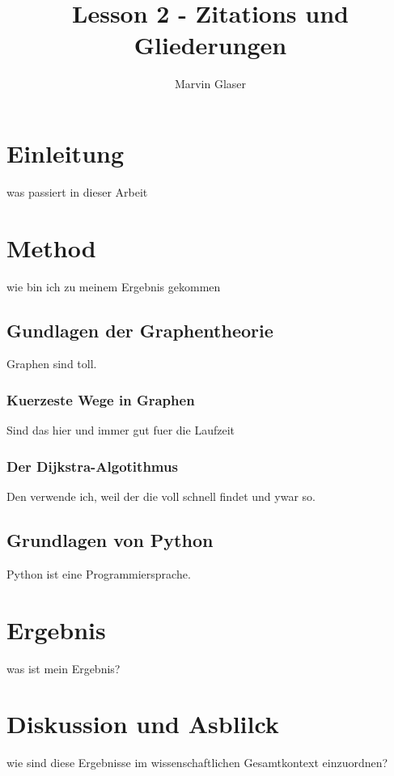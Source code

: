 \documentclass{article}
\title{Lesson 2 - Zitations und Gliederungen}
\author{Marvin Glaser}
\begin{document}
\tableofcontents
\newpage
\maketitle

\section{Einleitung}
was passiert in dieser Arbeit

\section{Method}
wie bin ich zu meinem Ergebnis gekommen

    \subsection{Gundlagen der Graphentheorie}
    Graphen sind toll.
    
        \subsubsection{Kuerzeste Wege in Graphen}
        Sind das hier und immer gut fuer die Laufzeit
        
        \subsubsection{Der Dijkstra-Algotithmus}
        Den verwende ich, weil der die voll schnell findet und ywar so.
    
    \subsection {Grundlagen von Python}
    Python ist eine Programmiersprache.

\section{Ergebnis}
was ist mein Ergebnis?

\section{Diskussion und Asblilck}
wie sind diese Ergebnisse im wissenschaftlichen Gesamtkontext einzuordnen?
\end{document}
